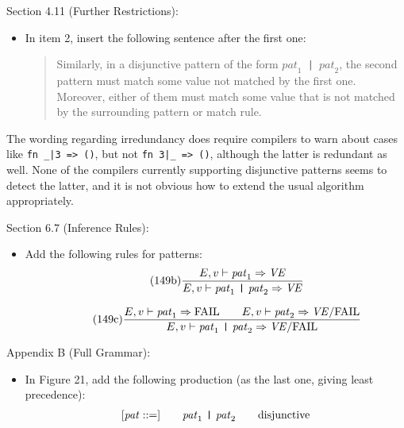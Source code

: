 \documentclass[twoside,titlepage]{article}
\begin{document}
\begin{appendix}
Section 4.11 (Further Restrictions):
\begin{itemize}
\item In item 2, insert the following sentence after the first one:
  \begin{quote}
  Similarly, in a disjunctive pattern of the form {\tt $\mathit{pat}_1$ | $\mathit{pat}_2$}, the second pattern must match some value not matched by the first one. Moreover, either of them must match some value that is not matched by the surrounding pattern or match rule.
  \end{quote}
\end{itemize}
The wording regarding irredundancy does require compilers to warn about cases like {\tt fn \_|3 => ()}, but not {\tt fn 3|\_ => ()}, although the latter is redundant as well. None of the compilers currently supporting disjunctive patterns seems to detect the latter, and it is not obvious how to extend the usual algorithm appropriately.

Section 6.7 (Inference Rules):
\begin{itemize}
\item Add the following rules for patterns:
  \begin{equation}
  \tag{149b}
  \frac{
  E,v \vdash \mathit{pat}_1 \Rightarrow \mathit{VE}
  }{
  E,v \vdash \mathit{pat}_1~\mbox{\tt|}~\mathit{pat}_2 \Rightarrow \mathit{VE}
  }
  \end{equation}

  \begin{equation}
  \tag{149c}
  \frac{
  E,v \vdash \mathit{pat}_1 \Rightarrow \mathrm{FAIL}
  \qquad
  E,v \vdash \mathit{pat}_2 \Rightarrow \mathit{VE}/\mathrm{FAIL}
  }{
  E,v \vdash \mathit{pat}_1~\mbox{\tt|}~\mathit{pat}_2 \Rightarrow \mathit{VE}/\mathrm{FAIL}
  }
  \end{equation}
\end{itemize}

Appendix B (Full Grammar):
\begin{itemize}
\item In Figure 21, add the following production (as the last one, giving least precedence):
  $$
  \begin{array}{l@{\qquad}l@{\qquad}l}
   [\mathit{pat} ::=] & \mathit{pat}_1~\mbox{\tt|}~\mathit{pat}_2 & \textrm{disjunctive}
  \end{array}
  $$
\end{itemize}


\end{appendix}
\end{document}
